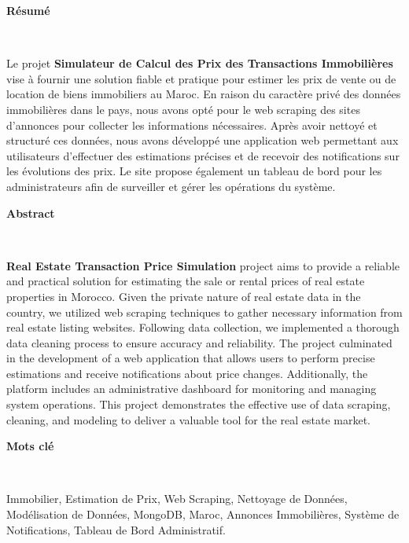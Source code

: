 \documentclass[a4paper,12pt]{report}
\numberwithin{equation}{section}
\begin{document}
\vspace*{6cm}
\begin{center}
    {\huge\bfseries Résumé\par} \
\end{center}
{\large  \par Le projet \textbf{Simulateur de Calcul des Prix des Transactions Immobilières} vise à fournir 
une solution fiable et pratique pour estimer les prix de vente ou de location de biens immobiliers 
au Maroc. En raison du caractère privé des données immobilières dans le pays, nous avons opté pour 
le web scraping des sites d'annonces pour collecter les informations nécessaires. Après avoir nettoyé
 et structuré ces données, nous avons développé une application web permettant aux utilisateurs 
 d'effectuer des estimations précises et de recevoir des notifications sur les évolutions des prix. 
Le site propose également un tableau de bord pour les administrateurs afin de surveiller et gérer 
les opérations du système.\par}
\newpage


\vspace*{5.5cm}
\begin{center}
    {\huge\bfseries Abstract\par} \
\end{center}
{\large  \par \textbf{Real Estate Transaction Price Simulation} project aims to provide a reliable and 
practical solution for estimating the sale or rental prices of real estate properties in Morocco. 
Given the private nature of real estate data in the country, we utilized web scraping techniques 
to gather necessary information from real estate listing websites. Following data collection, we 
implemented a thorough data cleaning process to ensure accuracy and reliability. The project 
culminated in the development of a web application that allows users to perform precise estimations
 and receive notifications about price changes. Additionally, the platform includes an administrative
  dashboard for monitoring and managing system operations. This project demonstrates the effective 
  use of data scraping, cleaning, and modeling to deliver a valuable tool for the real estate 
  market.\par}

\newpage


\vspace*{3.5cm}
\begin{center}
    {\huge\bfseries Mots clé\par} \
\end{center}
{\large Immobilier, Estimation de Prix, Web Scraping, Nettoyage de Données, Modélisation de Données, MongoDB, Maroc, Annonces Immobilières, Système de Notifications, Tableau de Bord Administratif.\par}
\end{document}
